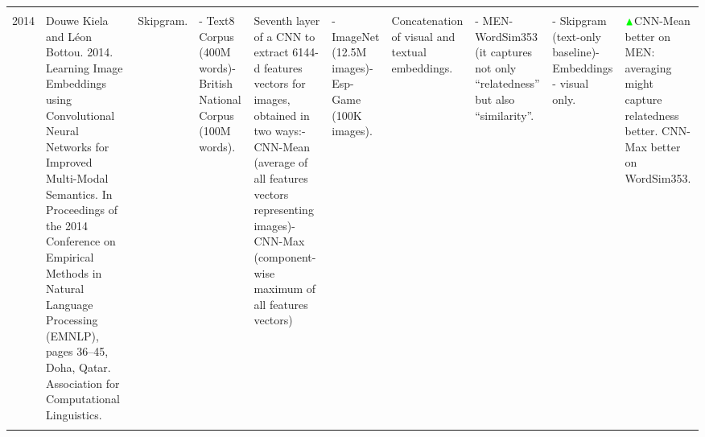\documentclass[
]{krantz}
\begin{document}
\begin{longtable}[]{@{}llllllllll@{}}
\begin{minipage}[t]{0.13\columnwidth}
\end{minipage}\tabularnewline
\begin{minipage}[t]{0.00\columnwidth}\raggedright
2014\strut
\end{minipage} & \begin{minipage}[t]{0.06\columnwidth}\raggedright
Douwe Kiela and Léon Bottou. 2014. Learning Image Embeddings using Convolutional Neural Networks for Improved Multi-Modal Semantics. In Proceedings of the 2014 Conference on Empirical Methods in Natural Language Processing (EMNLP), pages 36--45, Doha, Qatar. Association for Computational Linguistics.\strut
\end{minipage} & \begin{minipage}[t]{0.04\columnwidth}\raggedright
Skipgram.\strut
\end{minipage} & \begin{minipage}[t]{0.02\columnwidth}\raggedright
- Text8 Corpus (400M words)- British National Corpus (100M words).\strut
\end{minipage} & \begin{minipage}[t]{0.07\columnwidth}\raggedright
Seventh layer of a CNN to extract 6144-d features vectors for images, obtained in two ways:- CNN-Mean (average of all features vectors representing images)- CNN-Max (component-wise maximum of all features vectors)\strut
\end{minipage} & \begin{minipage}[t]{0.05\columnwidth}\raggedright
- ImageNet (12.5M images)- Esp-Game (100K images).\strut
\end{minipage} & \begin{minipage}[t]{0.25\columnwidth}\raggedright
Concatenation of visual and textual embeddings.\strut
\end{minipage} & \begin{minipage}[t]{0.08\columnwidth}\raggedright
- MEN- WordSim353 (it captures not only ``relatedness'' but also ``similarity''.\strut
\end{minipage} & \begin{minipage}[t]{0.05\columnwidth}\raggedright
- Skipgram (text-only baseline)- Embeddings - visual only.\strut
\end{minipage} & \begin{minipage}[t]{0.13\columnwidth}\raggedright
\(\color{green}\blacktriangle\)CNN-Mean better on MEN: averaging might capture relatedness better. CNN-Max better on WordSim353.\strut
\end{minipage}\tabularnewline
\begin{minipage}[t]{0.00\columnwidth}\raggedright

\end{minipage}
\end{longtable}
\end{document}
